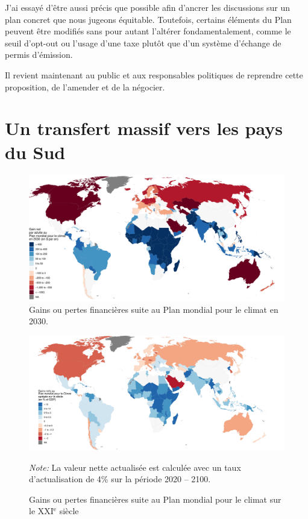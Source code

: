 \documentclass[a5paper,french]{memoir}
\begin{document}
J'ai essayé d'être aussi précis que possible afin d'ancrer les discussions sur un plan concret que nous jugeons équitable. Toutefois, certains éléments du Plan peuvent être modifiés sans pour autant l'altérer fondamentalement, comme le seuil d'opt-out ou l'usage d'une taxe plutôt que d'un système d'échange de permis d'émission. 

Il revient maintenant au public et aux responsables politiques de reprendre cette proposition, de l'amender et de la négocier.

\chapter{Un transfert massif vers les pays du Sud\label{ch:effets_distributifs}}

\begin{figure}[h!]
  \caption{Gains ou pertes financières suite au Plan mondial pour le climat en 2030.}\label{fig:median_gain_2015}
  \centerline{\includegraphics[width=.97\paperwidth]{../figures/maps/gain_adj_2030_fr.pdf}} %
\end{figure}

\begin{figure}[b!]
  \caption{Gains ou pertes financières suite au Plan mondial pour le climat sur le XXI$^\text{e}$ siècle}\label{fig:median_gain_adj}
  \centerline{
    \includegraphics[width=\paperwidth]{../figures/maps/npv_over_gdp_gcs_adj_fr.pdf}
    } %
  {\footnotesize \textit{Note:} La valeur nette actualisée est calculée avec un taux d'actualisation de 4\% sur la période 2020 -- 2100.}
\end{figure}
\end{document}
